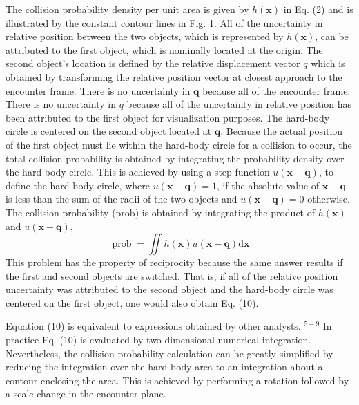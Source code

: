 \documentclass[10pt]{article}
\begin{document}
The collision probability density per unit area is given by $h(\boldsymbol{x})$ in Eq. (2) and is illustrated by the constant contour lines in Fig. 1. All of the uncertainty in relative position between the two objects, which is represented by $h(\boldsymbol{x})$, can be attributed to the first object, which is nominally located at the origin. The second object's location is defined by the relative displacement vector $q$ which is obtained by transforming the relative position vector at closest approach to the encounter frame. There is no uncertainty in $\boldsymbol{q}$ because all of the encounter frame. There is no uncertainty in $q$ because all of the uncertainty in relative position has been attributed to the first object for visualization purposes. The hard-body circle is centered on the second object located at $\boldsymbol{q}$. Because the actual position of the first object must lie within the hard-body circle for a collision to occur, the total collision probability is obtained by integrating the probability density over the hard-body circle. This is achieved by using a step function $u(\boldsymbol{x}-\boldsymbol{q})$, to define the hard-body circle, where $u(\boldsymbol{x}-\boldsymbol{q})=1$, if the absolute value of $\boldsymbol{x}-\boldsymbol{q}$ is less than the sum of the radii of the two objects and $u(\boldsymbol{x}-\boldsymbol{q})=0$ otherwise. The collision probability (prob) is obtained by integrating the product of $h(\boldsymbol{x})$ and $u(\boldsymbol{x}-\boldsymbol{q})$,
$$
\operatorname{prob}=\iint h(\boldsymbol{x}) u(\boldsymbol{x}-\boldsymbol{q}) \mathrm{d} \boldsymbol{x}
$$
This problem has the property of reciprocity because the same answer results if the first and second objects are switched. That is, if all of the relative position uncertainty was attributed to the second object and the hard-body circle was centered on the first object, one would also obtain Eq. (10).

Equation (10) is equivalent to expressions obtained by other analysts. ${ }^{5-9}$ In practice Eq. (10) is evaluated by two-dimensional numerical integration. Nevertheless, the collision probability calculation can be greatly simplified by reducing the integration over the hard-body area to an integration about a contour enclosing the area. This is achieved by performing a rotation followed by a scale change in the encounter plane.
\end{document}
